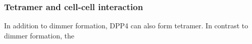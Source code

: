 \subsubsection{Tetramer and cell-cell interaction}

In addition to dimmer formation, DPP4 can also form tetramer. In contrast to dimmer formation, the 